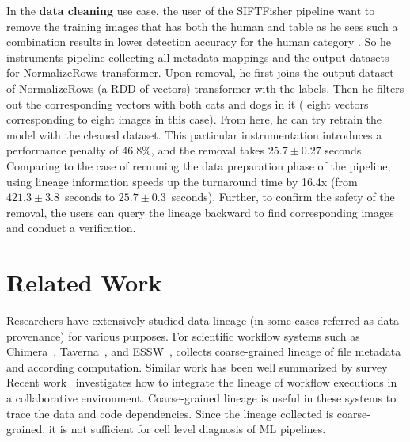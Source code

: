 \documentclass{sig-alternate}
\begin{document}
In the {\bf data cleaning} use case, the user of the SIFTFisher pipeline want to remove the training images that has both the human and table as
he sees such a combination results in lower detection accuracy for the human category .
So he instruments pipeline collecting all metadata mappings and the output datasets for NormalizeRows transformer. 
Upon removal, he first joins the output dataset of NormalizeRows (a RDD of vectors) transformer with the labels.
Then he filters out the corresponding vectors with both cats and dogs in it ( eight vectors corresponding to eight images in this case). 
From here, he can try retrain the model with the cleaned dataset. 
This particular instrumentation introduces a performance penalty of 46.8\%, and the removal takes $25.7\pm0.27$ seconds.
Comparing to the case of rerunning the data preparation phase of the pipeline, using lineage information speeds up the turnaround
time by 16.4x (from $421.3\pm3.8$~seconds to $25.7\pm0.3$~seconds). 
Further, to confirm the safety of the removal, the users can query the lineage backward to find corresponding 
images and conduct a verification.

\section{Related Work}
\label{sec:Related}
Researchers have extensively studied data lineage (in some cases referred as data provenance) for various purposes.
For scientific workflow systems such as  Chimera~\cite{foster02}, Taverna~\cite{oinn02}, and ESSW~\cite{frew01}, 
collects coarse-grained lineage of file metadata and according computation. 
Similar work has been well summarized by survey~\cite{simmhan05, freire08, bose05}
Recent work~\cite{altintas10} investigates how to integrate the lineage of workflow executions
in a collaborative environment. Coarse-grained lineage is useful in these systems to trace the data and code dependencies.
Since the lineage collected is coarse-grained, it is not sufficient for cell level diagnosis of ML pipelines.
\end{document}

